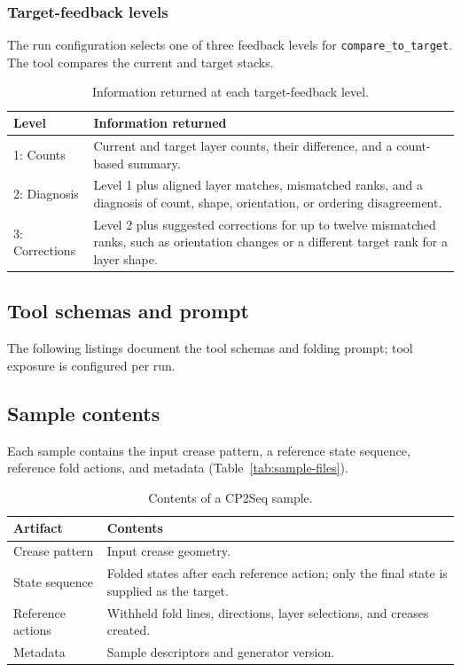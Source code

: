 \subsubsection{Target-feedback levels}
\label{app:feedback-levels}
The run configuration selects one of three feedback levels for
\texttt{compare\_to\_target}. The tool compares the current and target stacks.

\begin{table}[h]
\centering
\caption{Information returned at each target-feedback level.}
\begin{tabular}{lp{}}
\hline
Level & Information returned \\
\hline
1: Counts & Current and target layer counts, their difference, and a count-based summary. \\
2: Diagnosis & Level 1 plus aligned layer matches, mismatched ranks, and a diagnosis of count,
shape, orientation, or ordering disagreement. \\
3: Corrections & Level 2 plus suggested corrections for up to twelve mismatched ranks, such as
orientation changes or a different target rank for a layer shape. \\
\hline
\end{tabular}
\end{table}

\subsection{Tool schemas and prompt}
The following listings document the tool schemas and folding prompt; tool exposure is configured per run.



\subsection{Sample contents}
\label{app:sample-contents}
Each sample contains the input crease pattern, a reference state sequence, reference
fold actions, and metadata (Table~\ref{tab:sample-files}).

\begin{table}[h]
\centering
\caption{Contents of a CP2Seq sample.}
\label{tab:sample-files}
\label{sec:cp2seq-sample}
\begin{tabular}{lp{}}
\hline
Artifact & Contents \\
\hline
Crease pattern & Input crease geometry. \\
State sequence & Folded states after each reference action; only the final state is supplied
as the target. \\
Reference actions & Withheld fold lines, directions, layer selections, and
creases created. \\
Metadata & Sample descriptors and generator version. \\
\hline
\end{tabular}
\end{table}

